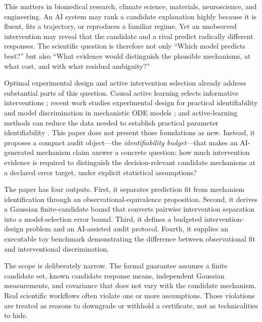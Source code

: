 \documentclass[11pt]{article}
\begin{document}
This matters in biomedical research, climate science, materials, neuroscience, and engineering. An AI system may rank a candidate explanation highly because it is fluent, fits a trajectory, or reproduces a familiar regime. Yet an unobserved intervention may reveal that the candidate and a rival predict radically different responses. The scientific question is therefore not only ``Which model predicts best?'' but also ``What evidence would distinguish the plausible mechanisms, at what cost, and with what residual ambiguity?''

Optimal experimental design and active intervention selection already address substantial parts of this question. Causal active learning selects informative interventions \citep{zhang2023}; recent work studies experimental design for practical identifiability and model discrimination in mechanistic ODE models \citep{liu2026}; and active-learning methods can reduce the data needed to establish practical parameter identifiability \citep{liu_active2025}. This paper does not present those foundations as new. Instead, it proposes a compact audit object—the \emph{identifiability budget}—that makes an AI-generated mechanism claim answer a concrete question: how much intervention evidence is required to distinguish the decision-relevant candidate mechanisms at a declared error target, under explicit statistical assumptions?

The paper has four outputs. First, it separates prediction fit from mechanism identification through an observational-equivalence proposition. Second, it derives a Gaussian finite-candidate bound that converts pairwise intervention separation into a model-selection error bound. Third, it defines a budgeted intervention-design problem and an AI-assisted audit protocol. Fourth, it supplies an executable toy benchmark demonstrating the difference between observational fit and interventional discrimination.

The scope is deliberately narrow. The formal guarantee assumes a finite candidate set, known candidate response means, independent Gaussian measurements, and covariance that does not vary with the candidate mechanism. Real scientific workflows often violate one or more assumptions. Those violations are treated as reasons to downgrade or withhold a certificate, not as technicalities to hide.
\end{document}

